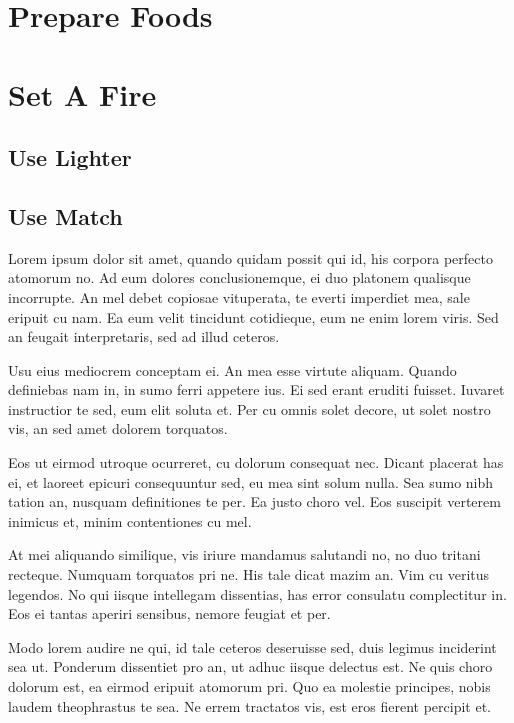 \documentclass[a4paper,twoside]{article}
\begin{document}
	\newpage
	\setcounter{page}{1}
	\begin{spacing}{1.2} 
	
	
	\section{Prepare Foods}
	
	\section{Set A Fire}
	
	\subsection{Use Lighter}
	\subsection{Use Match}
	
	Lorem ipsum dolor sit amet, quando quidam possit qui id, his corpora perfecto atomorum no. Ad eum dolores conclusionemque, ei duo platonem qualisque incorrupte. An mel debet copiosae vituperata, te everti imperdiet mea, sale eripuit cu nam. Ea eum velit tincidunt cotidieque, eum ne enim lorem viris. Sed an feugait interpretaris, sed ad illud ceteros.
	
	Usu eius mediocrem conceptam ei. An mea esse virtute aliquam. Quando definiebas nam in, in sumo ferri appetere ius. Ei sed erant eruditi fuisset. Iuvaret instructior te sed, eum elit soluta et. Per cu omnis solet decore, ut solet nostro vis, an sed amet dolorem torquatos.
	
	Eos ut eirmod utroque ocurreret, cu dolorum consequat nec. Dicant placerat has ei, et laoreet epicuri consequuntur sed, eu mea sint solum nulla. Sea sumo nibh tation an, nusquam definitiones te per. Ea justo choro vel. Eos suscipit verterem inimicus et, minim contentiones cu mel.
	
	\newpage
	
	At mei aliquando similique, vis iriure mandamus salutandi no, no duo tritani recteque. Numquam torquatos pri ne. His tale dicat mazim an. Vim cu veritus legendos. No qui iisque intellegam dissentias, has error consulatu complectitur in. Eos ei tantas aperiri sensibus, nemore feugiat et per.
	
	\newpage
	
	Modo lorem audire ne qui, id tale ceteros deseruisse sed, duis legimus inciderint sea ut. Ponderum dissentiet pro an, ut adhuc iisque delectus est. Ne quis choro dolorum est, ea eirmod eripuit atomorum pri. Quo ea molestie principes, nobis laudem theophrastus te sea. Ne errem tractatos vis, est eros fierent percipit et.
	

\end{spacing}
\end{document}
